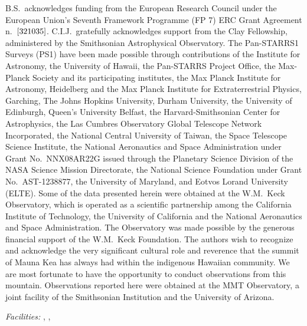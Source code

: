 \documentclass[iop]{emulateapj}
\begin{document}
B.S.~acknowledges funding from the European Research Council under the European
Union’s Seventh Framework Programme (FP 7) ERC Grant Agreement
n.~${\rm [321035]}$. C.I.J.~gratefully acknowledges support from the Clay
Fellowship, administered by the Smithsonian Astrophysical Observatory. The
Pan-STARRS1 Surveys (PS1) have been made possible through contributions of the
Institute for Astronomy, the University of Hawaii, the Pan-STARRS Project
Office, the Max-Planck Society and its participating institutes, the Max Planck
Institute for Astronomy, Heidelberg and the Max Planck Institute for
Extraterrestrial Physics, Garching, The Johns Hopkins University, Durham
University, the University of Edinburgh, Queen's University Belfast, the
Harvard-Smithsonian Center for Astrophysics, the Las Cumbres Observatory Global
Telescope Network Incorporated, the National Central University of Taiwan, the
Space Telescope Science Institute, the National Aeronautics and Space
Administration under Grant No.~NNX08AR22G issued through the Planetary Science
Division of the NASA Science Mission Directorate, the National Science
Foundation under Grant No.~AST-1238877, the University of Maryland, and Eotvos
Lorand University (ELTE). Some of the data presented herein were obtained at the
W.M.~Keck Observatory, which is operated as a scientific partnership among the
California Institute of Technology, the University of California and the
National Aeronautics and Space Administration. The Observatory was made possible
by the generous financial support of the W.M.~Keck Foundation. The authors wish
to recognize and acknowledge the very significant cultural role and reverence
that the summit of Mauna Kea has always had within the indigenous Hawaiian
community. We are most fortunate to have the opportunity to conduct observations
from this mountain. Observations reported here were obtained at the MMT
Observatory, a joint facility of the Smithsonian Institution and the University
of Arizona.

{\it Facilities:} , , 




\clearpage
\end{document}
